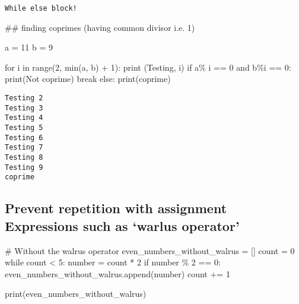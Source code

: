 \documentclass[
]{report}
\newenvironment{Shaded}{\begin{snugshade}}{\end{snugshade}}
\newcommand{\BuiltInTok}[1]{\textcolor[rgb]{0.00,0.23,0.31}{#1}}
\newcommand{\CommentTok}[1]{\textcolor[rgb]{0.37,0.37,0.37}{#1}}
\newcommand{\ControlFlowTok}[1]{\textcolor[rgb]{0.00,0.23,0.31}{#1}}
\newcommand{\DecValTok}[1]{\textcolor[rgb]{0.68,0.00,0.00}{#1}}
\newcommand{\KeywordTok}[1]{\textcolor[rgb]{0.00,0.23,0.31}{#1}}
\newcommand{\NormalTok}[1]{\textcolor[rgb]{0.00,0.23,0.31}{#1}}
\newcommand{\OperatorTok}[1]{\textcolor[rgb]{0.37,0.37,0.37}{#1}}
\newcommand{\StringTok}[1]{\textcolor[rgb]{0.13,0.47,0.30}{#1}}
\begin{document}
\begin{verbatim}
While else block!
\end{verbatim}

\begin{Shaded}
\begin{Highlighting}[]
\CommentTok{\#\# finding coprimes (having common divisor i.e. 1)}

\NormalTok{a }\OperatorTok{=} \DecValTok{11}
\NormalTok{b }\OperatorTok{=} \DecValTok{9}

\ControlFlowTok{for}\NormalTok{ i }\KeywordTok{in} \BuiltInTok{range}\NormalTok{(}\DecValTok{2}\NormalTok{, }\BuiltInTok{min}\NormalTok{(a, b) }\OperatorTok{+} \DecValTok{1}\NormalTok{):}
    \BuiltInTok{print}\NormalTok{ (}\StringTok{\textquotesingle{}Testing\textquotesingle{}}\NormalTok{, i)}
    \ControlFlowTok{if}\NormalTok{ a}\OperatorTok{\%}\NormalTok{ i }\OperatorTok{==} \DecValTok{0} \KeywordTok{and}\NormalTok{ b}\OperatorTok{\%}\NormalTok{i }\OperatorTok{==} \DecValTok{0}\NormalTok{:}
        \BuiltInTok{print}\NormalTok{(}\StringTok{\textquotesingle{}Not coprime\textquotesingle{}}\NormalTok{)}
        \ControlFlowTok{break}
\ControlFlowTok{else}\NormalTok{:}
    \BuiltInTok{print}\NormalTok{(}\StringTok{\textquotesingle{}coprime\textquotesingle{}}\NormalTok{)}
\end{Highlighting}
\end{Shaded}

\begin{verbatim}
Testing 2
Testing 3
Testing 4
Testing 5
Testing 6
Testing 7
Testing 8
Testing 9
coprime
\end{verbatim}

\hypertarget{prevent-repetition-with-assignment-expressions-such-as-warlus-operator}{%
\subsection{Prevent repetition with assignment Expressions such as
`warlus
operator'}\label{prevent-repetition-with-assignment-expressions-such-as-warlus-operator}}

\begin{Shaded}
\begin{Highlighting}[]
\CommentTok{\# Without the walrus operator}
\NormalTok{even\_numbers\_without\_walrus }\OperatorTok{=}\NormalTok{ []}
\NormalTok{count }\OperatorTok{=} \DecValTok{0}
\ControlFlowTok{while}\NormalTok{ count }\OperatorTok{\textless{}} \DecValTok{5}\NormalTok{:}
\NormalTok{    number }\OperatorTok{=}\NormalTok{ count }\OperatorTok{*} \DecValTok{2}
    \ControlFlowTok{if}\NormalTok{ number }\OperatorTok{\%} \DecValTok{2} \OperatorTok{==} \DecValTok{0}\NormalTok{:}
\NormalTok{        even\_numbers\_without\_walrus.append(number)}
\NormalTok{        count }\OperatorTok{+=} \DecValTok{1}

\BuiltInTok{print}\NormalTok{(even\_numbers\_without\_walrus)}
\end{Highlighting}
\end{Shaded}
\end{document}
